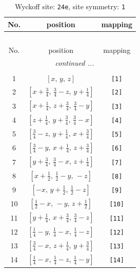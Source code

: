 \documentclass[fleqn,8pt]{jsarticle}
\begin{document}
\begin{longtable}{ccc}
\caption{Wyckoff site: {\tt 24e}, site symmetry: {\tt 1}}
 \\
 \hline \hline
No. & position & mapping \\ \hline \endfirsthead

\multicolumn{2}{l}{\tablename\ \thetable{}} \\
 \hline \hline
No. & position & mapping \\ \hline \endhead

 \hline \hline
\multicolumn{2}{r}{\footnotesize\it continued ...} \\ \endfoot

 \hline \hline
\multicolumn{2}{r}{} \\ \endlastfoot

1 & $\left[ x,\, y,\, z \right]$ & {\tt [1]} \\ \hline
2 & $\left[ x + \frac{3}{4},\, \frac{3}{4} - z,\, y + \frac{1}{4} \right]$ & {\tt [2]} \\ \hline
3 & $\left[ x + \frac{1}{4},\, z + \frac{3}{4},\, \frac{3}{4} - y \right]$ & {\tt [3]} \\ \hline
4 & $\left[ z + \frac{1}{4},\, y + \frac{3}{4},\, \frac{3}{4} - x \right]$ & {\tt [4]} \\ \hline
5 & $\left[ \frac{3}{4} - z,\, y + \frac{1}{4},\, x + \frac{3}{4} \right]$ & {\tt [5]} \\ \hline
6 & $\left[ \frac{3}{4} - y,\, x + \frac{1}{4},\, z + \frac{3}{4} \right]$ & {\tt [6]} \\ \hline
7 & $\left[ y + \frac{3}{4},\, \frac{3}{4} - x,\, z + \frac{1}{4} \right]$ & {\tt [7]} \\ \hline
8 & $\left[ x + \frac{1}{2},\, \frac{1}{2} - y,\, - z \right]$ & {\tt [8]} \\ \hline
9 & $\left[ - x,\, y + \frac{1}{2},\, \frac{1}{2} - z \right]$ & {\tt [9]} \\ \hline
10 & $\left[ \frac{1}{2} - x,\, - y,\, z + \frac{1}{2} \right]$ & {\tt [10]} \\ \hline
11 & $\left[ y + \frac{1}{4},\, x + \frac{3}{4},\, \frac{3}{4} - z \right]$ & {\tt [11]} \\ \hline
12 & $\left[ \frac{1}{4} - y,\, \frac{1}{4} - x,\, \frac{1}{4} - z \right]$ & {\tt [12]} \\ \hline
13 & $\left[ \frac{3}{4} - x,\, z + \frac{1}{4},\, y + \frac{3}{4} \right]$ & {\tt [13]} \\ \hline
14 & $\left[ \frac{1}{4} - x,\, \frac{1}{4} - z,\, \frac{1}{4} - y \right]$ & {\tt [14]} \\ \hline

\end{longtable}
\end{document}
